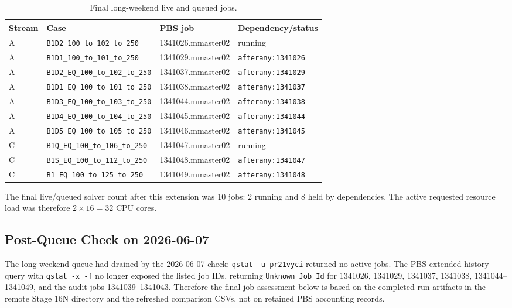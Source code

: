 \documentclass[11pt,a4paper]{article}
\newcommand{\code}[1]{\texttt{#1}}
\begin{document}
\begin{table}[H]
\centering
\caption{Final long-weekend live and queued jobs.}
\begin{tabular}{llll}
\toprule
Stream & Case & PBS job & Dependency/status \\
\midrule
A & \code{B1D2\_100\_to\_102\_to\_250} & 1341026.mmaster02 & running \\
A & \code{B1D1\_100\_to\_101\_to\_250} & 1341029.mmaster02 & \code{afterany:1341026} \\
A & \code{B1D2\_EQ\_100\_to\_102\_to\_250} & 1341037.mmaster02 & \code{afterany:1341029} \\
A & \code{B1D1\_EQ\_100\_to\_101\_to\_250} & 1341038.mmaster02 & \code{afterany:1341037} \\
A & \code{B1D3\_EQ\_100\_to\_103\_to\_250} & 1341044.mmaster02 & \code{afterany:1341038} \\
A & \code{B1D4\_EQ\_100\_to\_104\_to\_250} & 1341045.mmaster02 & \code{afterany:1341044} \\
A & \code{B1D5\_EQ\_100\_to\_105\_to\_250} & 1341046.mmaster02 & \code{afterany:1341045} \\
C & \code{B1Q\_EQ\_100\_to\_106\_to\_250} & 1341047.mmaster02 & running \\
C & \code{B1S\_EQ\_100\_to\_112\_to\_250} & 1341048.mmaster02 & \code{afterany:1341047} \\
C & \code{B1\_EQ\_100\_to\_125\_to\_250} & 1341049.mmaster02 & \code{afterany:1341048} \\
\bottomrule
\end{tabular}
\end{table}

The final live/queued solver count after this extension was 10 jobs: 2 running and 8 held by dependencies. The active requested resource load was therefore $2 \times 16 = 32$ CPU cores.

\subsection{Post-Queue Check on 2026-06-07}

The long-weekend queue had drained by the 2026-06-07 check: \code{qstat -u pr21vyci} returned no active jobs. The PBS extended-history query with \code{qstat -x -f} no longer exposed the listed job IDs, returning \code{Unknown Job Id} for 1341026, 1341029, 1341037, 1341038, 1341044--1341049, and the audit jobs 1341039--1341043. Therefore the final job assessment below is based on the completed run artifacts in the remote Stage 16N directory and the refreshed comparison CSVs, not on retained PBS accounting records.
\end{document}
